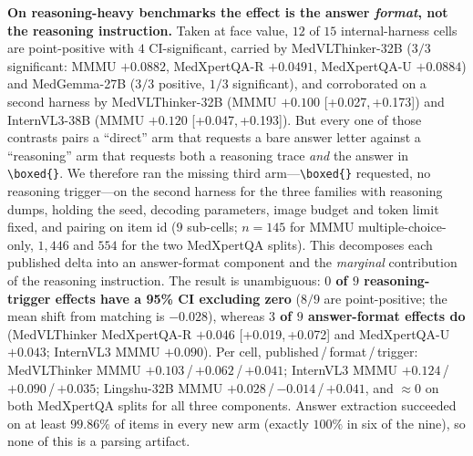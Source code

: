 \documentclass[conference]{IEEEtran}
\newcommand{\ci}[2]{{\footnotesize[#1,\,#2]}}
\begin{document}
\textbf{On reasoning-heavy benchmarks the effect is the answer \emph{format}, not the reasoning instruction.} Taken at face value, $12$ of $15$ internal-harness cells are point-positive with $4$ CI-significant, carried by MedVLThinker-32B ($3/3$ significant: MMMU $+0.0882$, MedXpertQA-R $+0.0491$, MedXpertQA-U $+0.0884$) and MedGemma-27B ($3/3$ positive, $1/3$ significant), and corroborated on a second harness by MedVLThinker-32B (MMMU $+0.100$ \ci{+0.027}{+0.173}) and InternVL3-38B (MMMU $+0.120$ \ci{+0.047}{+0.193}). But every one of those contrasts pairs a ``direct'' arm that requests a bare answer letter against a ``reasoning'' arm that requests both a reasoning trace \emph{and} the answer in \texttt{\textbackslash boxed\{\}}. We therefore ran the missing third arm---\texttt{\textbackslash boxed\{\}} requested, no reasoning trigger---on the second harness for the three families with reasoning dumps, holding the seed, decoding parameters, image budget and token limit fixed, and pairing on item id ($9$ sub-cells; $n{=}145$ for MMMU multiple-choice-only, $1{,}446$ and $554$ for the two MedXpertQA splits). This decomposes each published delta into an answer-format component and the \emph{marginal} contribution of the reasoning instruction. The result is unambiguous: \textbf{$0$ of $9$ reasoning-trigger effects have a 95\% CI excluding zero} ($8/9$ are point-positive; the mean shift from matching is $-0.028$), whereas \textbf{$3$ of $9$ answer-format effects do} (MedVLThinker MedXpertQA-R $+0.046$ \ci{+0.019}{+0.072} and MedXpertQA-U $+0.043$; InternVL3 MMMU $+0.090$). Per cell, published\,/\,format\,/\,trigger: MedVLThinker MMMU $+0.103$\,/\,$+0.062$\,/\,$+0.041$; InternVL3 MMMU $+0.124$\,/\,$+0.090$\,/\,$+0.035$; Lingshu-32B MMMU $+0.028$\,/\,$-0.014$\,/\,$+0.041$, and $\approx0$ on both MedXpertQA splits for all three components. Answer extraction succeeded on at least $99.86\%$ of items in every new arm (exactly $100\%$ in six of the nine), so none of this is a parsing artifact.
\end{document}
